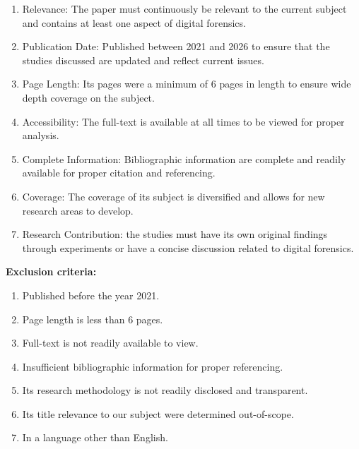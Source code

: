 \documentclass[12pt,a4paper]{article}
\begin{document}
\begin{justify}
\begin{enumerate}
    \item Relevance: The paper must continuously be relevant to the current subject and contains at least one aspect of digital forensics. 
    \item Publication Date: Published between 2021 and 2026 to ensure that the studies discussed are updated and reflect current issues.
    \item Page Length: Its pages were a minimum of 6 pages in length to ensure wide depth coverage on the subject. 
    \item Accessibility: The full-text is available at all times to be viewed for proper analysis.
    \item Complete Information: Bibliographic information are complete and readily available for proper citation and referencing.
    \item Coverage: The coverage of its subject is diversified and allows for new research areas to develop.
    \item Research Contribution: the studies must have its own original findings through experiments or have a concise discussion related to digital forensics.
\end{enumerate}

\textbf{Exclusion criteria:}

\begin{enumerate}
    \item Published before the year 2021.
    \item Page length is less than 6 pages. 
    \item Full-text is not readily available to view. 
    \item Insufficient bibliographic information for proper referencing.
    \item Its research methodology is not readily disclosed and transparent. 
    \item Its title relevance to our subject were determined out-of-scope. 
    \item In a language other than English.
\end{enumerate}

\end{justify}
\end{document}
